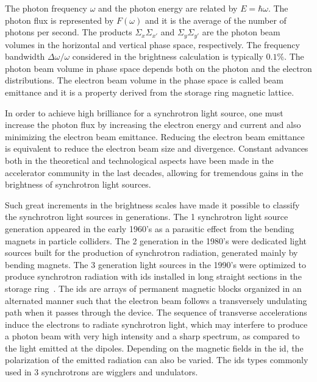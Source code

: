 The photon frequency $\omega$ and the photon energy are related by $E = \hbar \omega$. The photon flux is represented by $F(\omega)$ and it is the average of the number of photons per second. The products $\Sigma_x \Sigma_{x'}$ and $\Sigma_y\Sigma_{y'}$ are the photon beam volumes in the horizontal and vertical phase space, respectively. The frequency bandwidth $\Delta \omega/\omega$ considered in the brightness calculation is typically $0.1\%$. The photon beam volume in phase space depends both on the photon and the electron distributions. The electron beam volume in the phase space is called beam emittance and it is a property derived from the storage ring magnetic lattice.

In order to achieve high brilliance for a synchrotron light source, one must increase the photon flux by increasing the electron energy and current and also minimizing the electron beam emittance. Reducing the electron beam emittance is equivalent to reduce the electron beam size and divergence. Constant advances both in the theoretical and technological aspects have been made in the accelerator community in the last decades, allowing for tremendous gains in the brightness of synchrotron light sources. 

Such great increments in the brightness scales have made it possible to classify the synchrotron light sources in generations. The 1 synchrotron light source generation appeared in the early 1960's as a parasitic effect from the bending magnets in particle colliders. The 2 generation in the 1980's were dedicated light sources built for the production of synchrotron radiation, generated mainly by bending magnets. The 3 generation light sources in the 1990's were optimized to produce synchrotron radiation with \glspl{id} installed in long straight sections in the storage ring~\cite{liu2017}. The \glspl{id} are arrays of permanent magnetic blocks organized in an alternated manner such that the electron beam follows a transversely undulating path when it passes through the device. The sequence of transverse accelerations induce the electrons to radiate synchrotron light, which may interfere to produce a photon beam with very high intensity and a sharp spectrum, as compared to the light emitted at the dipoles. Depending on the magnetic fields in the \gls{id}, the polarization of the emitted radiation can also be varied. The \glspl{id} types commonly used in 3 synchrotrons are wigglers and undulators.

